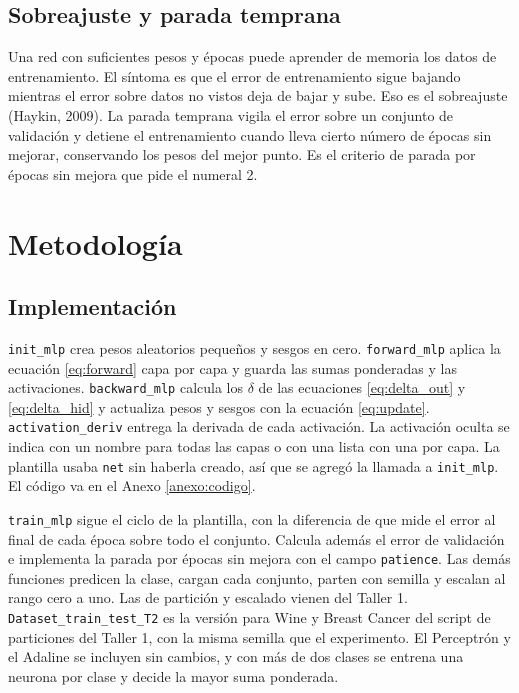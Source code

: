 \documentclass[11pt,letterpaper]{article}
\begin{document}
\subsection{Sobreajuste y parada temprana}

Una red con suficientes pesos y épocas puede aprender de memoria los datos de entrenamiento. El síntoma es que el error de entrenamiento sigue bajando mientras el error sobre datos no vistos deja de bajar y sube. Eso es el sobreajuste (Haykin, 2009). La parada temprana vigila el error sobre un conjunto de validación y detiene el entrenamiento cuando lleva cierto número de épocas sin mejorar, conservando los pesos del mejor punto. Es el criterio de parada por épocas sin mejora que pide el numeral 2.

\section{Metodología}

\subsection{Implementación}

\texttt{init\_mlp} crea pesos aleatorios pequeños y sesgos en cero. \texttt{forward\_mlp} aplica la ecuación \eqref{eq:forward} capa por capa y guarda las sumas ponderadas y las activaciones. \texttt{backward\_mlp} calcula los $\delta$ de las ecuaciones \eqref{eq:delta_out} y \eqref{eq:delta_hid} y actualiza pesos y sesgos con la ecuación \eqref{eq:update}. \texttt{activation\_deriv} entrega la derivada de cada activación. La activación oculta se indica con un nombre para todas las capas o con una lista con una por capa. La plantilla usaba \texttt{net} sin haberla creado, así que se agregó la llamada a \texttt{init\_mlp}. El código va en el Anexo \ref{anexo:codigo}.

\texttt{train\_mlp} sigue el ciclo de la plantilla, con la diferencia de que mide el error al final de cada época sobre todo el conjunto. Calcula además el error de validación e implementa la parada por épocas sin mejora con el campo \texttt{patience}. Las demás funciones predicen la clase, cargan cada conjunto, parten con semilla y escalan al rango cero a uno. Las de partición y escalado vienen del Taller 1. \texttt{Dataset\_train\_test\_T2} es la versión para Wine y Breast Cancer del script de particiones del Taller 1, con la misma semilla que el experimento. El Perceptrón y el Adaline se incluyen sin cambios, y con más de dos clases se entrena una neurona por clase y decide la mayor suma ponderada.
\end{document}
